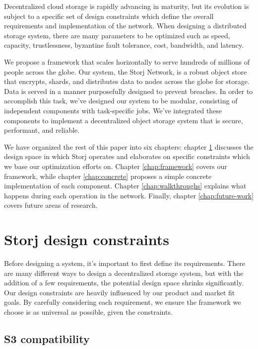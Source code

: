 \documentclass[11pt,fleqn,openany]{book}
\begin{document}
Decentralized cloud storage is rapidly advancing in maturity, but its evolution
is subject to a specific set of design constraints which
define the overall requirements and implementation of
the network. When designing a distributed storage system,
there are many parameters to be optimized such as speed, capacity,
trustlessness, byzantine fault tolerance, cost, bandwidth, and latency.

We propose a framework that scales horizontally to serve hundreds of millions of
people across the globe. Our system, the Storj Network, is a robust object store
that encrypts, shards, and distributes data to nodes across the globe for
storage.
Data is served in a manner purposefully designed to prevent
breaches.
In order to accomplish this task, we've designed our system to be modular,
consisting of independent components with task-specific jobs.
We've integrated these components to implement a decentralized object storage
system that is secure, performant, and reliable.

We have organized the rest of this paper into six
chapters: chapter \ref{chap:design-constraints} discusses the design space
in which Storj operates and elaborates on specific constraints which
we base our optimization efforts on.
Chapter \ref{chap:framework} covers our framework, while chapter
\ref{chap:concrete}
proposes a simple concrete implementation of each component.
Chapter \ref{chap:walkthroughs} explains what happens
during each operation in the network. Finally, chapter
\ref{chap:future-work} covers future areas of research.

\chapter{Storj design constraints}\label{chap:design-constraints}

Before designing a system, it's important to first define its requirements.
There are many different ways to design a decentralized storage system, but
with the addition of a few requirements, the potential design space shrinks
significantly.
Our design constraints are heavily influenced by our product and
market fit goals.
By carefully considering each requirement, we ensure the framework
we choose is as universal as possible, given the constraints.

\section{S3 compatibility}
\end{document}

